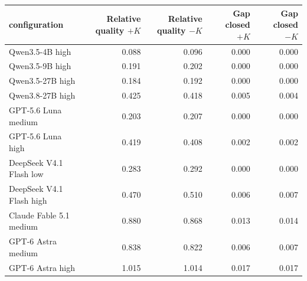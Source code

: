 \begin{tabular}{@{}lrrrr@{}}
\toprule
configuration & \shortstack{Relative quality\\$+K$} & \shortstack{Relative quality\\$-K$} & \shortstack{Gap closed\\$+K$} & \shortstack{Gap closed\\$-K$} \\
\midrule
Qwen3.5-4B high & 0.088 & 0.096 & 0.000 & 0.000 \\
Qwen3.5-9B high & 0.191 & 0.202 & 0.000 & 0.000 \\
Qwen3.5-27B high & 0.184 & 0.192 & 0.000 & 0.000 \\
Qwen3.8-27B high & 0.425 & 0.418 & 0.005 & 0.004 \\
GPT-5.6 Luna medium & 0.203 & 0.207 & 0.000 & 0.000 \\
GPT-5.6 Luna high & 0.419 & 0.408 & 0.002 & 0.002 \\
DeepSeek V4.1 Flash low & 0.283 & 0.292 & 0.000 & 0.000 \\
DeepSeek V4.1 Flash high & 0.470 & 0.510 & 0.006 & 0.007 \\
Claude Fable 5.1 medium & 0.880 & 0.868 & 0.013 & 0.014 \\
GPT-6 Astra medium & 0.838 & 0.822 & 0.006 & 0.007 \\
GPT-6 Astra high & 1.015 & 1.014 & 0.017 & 0.017 \\
\bottomrule
\end{tabular}
